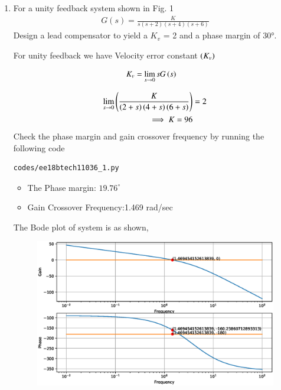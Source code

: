 \begin{enumerate}[label=\thesection.\arabic*.,ref=\thesection.\theenumi]

\item For a unity feedback system shown in Fig. 1
\begin{align}
G(s) =\frac{K}{s(s+2)(s+4)(s+6)}
\label{eq:ee18btech11036_system1}
\end{align}
Design a lead compensator to yield a $K_v$ = 2 and a phase margin of 30°.
\begin{figure}[!ht]
	\centering
	\resizebox{\columnwidth}{!}{}
\caption{}
\label{fig:ee18btech11036}
\end{figure}

\solution 
For unity feedback we have Velocity error constant $\left(K_v\right)$

\begin{align}
K_v &= \lim_{s \to 0} s G\brak{s} 
\label{eq:ee18btech11036_Kv}
\end{align}

\begin{align}
\lim_{s \to 0} \brak{\frac{K}{\brak{2+s}\brak{4+s}\brak{6+s}} }& = 2 
\\
\implies K = 96
\label{eq:ee18btech11036_init_cond}
\end{align}
Check the phase margin and gain crossover frequency by running the following code
\begin{lstlisting}
codes/ee18btech11036_1.py
\end{lstlisting}
\begin{itemize}
    \item The Phase margin: $19.76^{\circ}$
    \item Gain Crossover Frequency:1.469  rad/sec
\end{itemize}
The Bode plot of system is as shown,
\begin{figure}[!ht]
  \centering
  \includegraphics[width=\columnwidth]{./figs/ee18btech11036_1.eps}
  \caption{}
  \label{fig:ee18btech11036_1}
\end{figure}


\end{enumerate}

